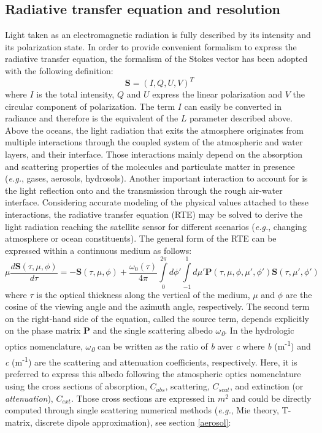 \documentclass{article}
\begin{document}
\subsection{Radiative transfer equation and resolution}
Light taken as an electromagnetic radiation is fully described by its intensity and its polarization state. In order to provide convenient formalism to express the radiative transfer equation, the formalism of the Stokes vector has been adopted with the following definition:
\begin{equation}
\mathbf{S}=\left(I,Q,U,V\right)^T
\label{eq:stokes}
\end{equation}
where $I$ is the total intensity, $Q$ and $U$ express the linear polarization and $V$ the circular component of polarization. The term $I$ can easily be converted in radiance and therefore is the equivalent of the $L$ parameter described above. 
Above the oceans, the light radiation that exits the atmosphere originates from multiple interactions through the coupled system of the atmospheric and water layers, and their interface. Those interactions mainly depend on the absorption and scattering properties of the molecules and particulate matter in presence (\textit{e.g.}, gases, aerosols, hydrosols). Another important interaction to account for is the light reflection onto and the transmission through the rough air-water interface. Considering accurate modeling of the physical values attached to these interactions, the radiative transfer equation (RTE) may be solved to derive the light radiation reaching the satellite sensor for different scenarios (\textit{e.g.}, changing atmosphere or ocean constituents). The general form of the RTE can be expressed within a continuous medium as follows:
\begin{equation}
\mu \frac{d\mathbf{S}\left( \tau ,\mu ,\phi  \right)}{d\tau }=-\mathbf{S}\left( \tau ,\mu ,\phi  \right)+\frac{{{\omega }_{0}}\left( \tau  \right)}{4\pi }\int\limits_{0}^{2\pi }{d{\phi }'}\int\limits_{-1}^{1}{d{\mu }'}\mathbf{P}\left( \tau ,\mu ,\phi ,{\mu }',{\phi }' \right)\mathbf{S}\left( \tau ,{\mu }',{\phi }' \right)
\label{eq:rt_equation}
\end{equation}
where \textit{$\tau$} is the optical thickness along the vertical of the medium, $\mu$ and $\phi$ are the cosine of the viewing angle and the azimuth angle, respectively. The second term on the right-hand side of the equation, called the source term, depends explicitly on the phase matrix \textbf{P} and the single scattering albedo \textit{$\omega$\textsubscript{0}}. In the hydrologic optics nomenclature, \textit{$\omega$\textsubscript{0}} can be written as the ratio of \textit{b} aver \textit{c} where \textit{b} (m\textsuperscript{-1}) and \textit{c} (m\textsuperscript{-1}) are the scattering and attenuation coefficients, respectively. Here, it is preferred to express this albedo following the atmospheric optics nomenclature using the cross sections of absorption, $C_{abs}$, scattering, $C_{scat}$, and extinction (or \textit{attenuation}), $C_{ext}$. Those cross sections are expressed in $m^2$ and could be directly computed through single scattering numerical methods (\textit{e.g.}, Mie theory, T-matrix, discrete dipole approximation), see section \ref{aerosol}:
\end{document}
